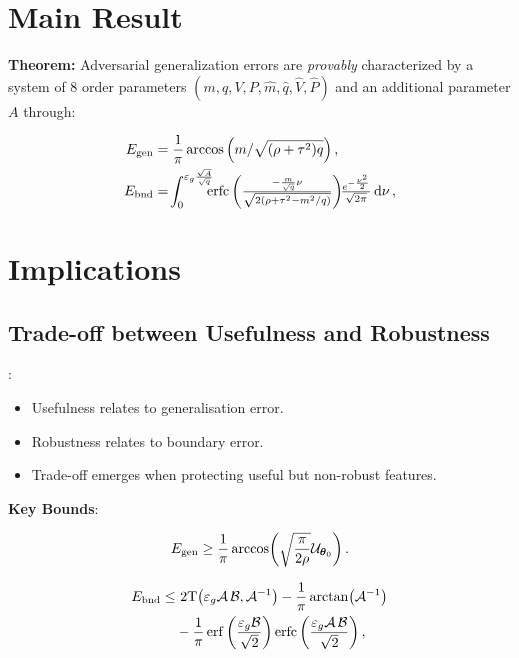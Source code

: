\documentclass[a0paper,fleqn]{betterportraitposter}
\theoremstyle{plain}
\theoremstyle{definition}
\theoremstyle{remark}
\begin{document}
{\begin{multicols}{3}
\section{Main Result}

\textbf{Theorem:} Adversarial generalization errors are \textit{provably} characterized by a system of 8 order parameters $(m, q, V, P, \hat{m}, \hat{q}, \hat{V}, \hat{P})$ and an additional parameter \(A\) through:

\begin{align}
    E_{\mathrm{gen}} &= \frac{1}{\pi} \arccos \qty( 
    {
        m / \sqrt{ (\rho + \tau^2) q}
    } 
    ) \,, \\
    E_{\mathrm{bnd}} &= \!
    \int_{0}^{\varepsilon_g \frac{\sqrt{A}}{\sqrt{q}}} \!\!\!\!
    {\textstyle
        \operatorname*{erfc}\left( \frac{ -\frac{m}{\sqrt{q}} \nu}{\sqrt{2 \qty(\rho + \tau^2 - m^2 / q)}} \right) 
        \!\! \frac{e^{-\frac{\nu^2}{2}}}{\sqrt{2\pi}} \dd{\nu}
    }
    \label{eq:adv-error-theorem-overlap} \,, 
\end{align}


\section{Implications}

\subsection{Trade-off between Usefulness and Robustness}:

\begin{itemize}
    \item Usefulness relates to generalisation error.
    \item Robustness relates to boundary error.
    \item Trade-off emerges when protecting useful but non-robust features.
\end{itemize}

\textbf{Key Bounds}:

\begin{equation}\label{eq:bound-gen-error}
    E_{\mathrm{gen}}
    \geq
    \frac{1}{\pi} \arccos( \sqrt{\frac{\pi}{2 \rho}} \mathcal{U}_{\boldsymbol{\theta}_0} ) \,. 
\end{equation}

\begin{align} \label{eq:bound-boundary-error}
    \bounderr \leq & \  
    2 \mathrm{T}\qty( \advgencost \mathcal{A} \, \mathcal{B}, \mathcal{A}^{-1} ) - \frac{1}{\pi} \arctan( \mathcal{A}^{-1} ) \nonumber\\ 
    & - \frac{1}{\pi} \erf\qty( \frac{\advgencost \mathcal{B}}{\sqrt{2}} ) \erfc\qty( \frac{\advgencost \mathcal{A} \, \mathcal{B}}{\sqrt{2}} ) \,,
\end{align}


\end{multicols}}
\end{document}
